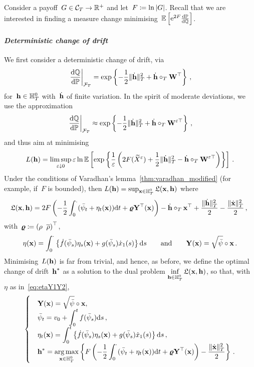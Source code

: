 Consider a payoff~$G\in\Cc_T\rightarrow\RR^{+}$ and let~$F\defEqual\nobreak\ln|G|$. 
Recall that we are interested in finding a measure change minimising~$\EE\left[\E^{2F}\frac{\D\PP}{\D\QQ}\right]$.\\

\paragraph{\textit{Deterministic change of drift}}
We first consider a deterministic change of drift, via 
\[
\left.\frac{\D\QQ}{\D\PP}\right\vert_{\Ff_T} = \exp\left\{-\frac{1}{2}\|\dot{\hh}\|_{T}^2 + \dot{\hh}\cT \Wf^\top\right\}\,,
\]
for~$\hh \in \HH_T^0$ with~$\dot{\hh}$ of finite variation. 
In the spirit of moderate deviations, we use the approximation 
\[
\left.\frac{\D\QQ}{\D\PP}\right\vert_{\Ff_T} \approx \exp\left\{-\frac{1}{2}\|\dot{\hh}\|_{T}^2 + \dot{\hh}\cT \Wf^{\eps\top}\right\}\,,
\]
and thus aim at minimising
\[
L(\hh) = \limsup\limits_{\eps \downarrow 0} \eps\ln\EE\left[\exp\left\{\frac{1}{\eps}\left(
2F(\widetilde{X}^\eps) + \frac{1}{2}\|\dot{\hh}\|_{T}^2 - \dot{\hh}\cT \Wf^{\eps\top}\right)\right\}\right]\,.
\]
Under the conditions of Varadhan's lemma~\ref{thm:varadhan_modified} 
(for example, if~$F$ is bounded), then
$L(\hh) =\nobreak \sup_{\xx \in \HH_T^0} \Lf(\xx,\hh)$ where
$$
\Lf(\xx,\hh)
 = 2 F\left(-\frac{1}{2}\int_0^.(\bar\psi_t + \eta_t(\xx))\D t + \vrho\Yf^\top(\xx) \right) - \dot{\hh}\cT\xx^\top + \frac{\|\dot{\hh}\|_{T}^2}{2} - \frac{\|\dot{\xx}\|_{T}^2}{2}\,,
~$$
with~$\vrho \defEqual \left(\rho \;\; \brho\right)^\top$,
\begin{equation}\label{eq:etaY1Y2}
\eta(\xx) = \int_0^\cdot\left\{\dot{f}(\bar\psi_s)\eta_s(\xx) + g(\bar\psi_s)\dot{x}_1(s)\right\}\D s
\qquad\text{and}\qquad
\Yf(\xx) = \sqrt{\bar\psi}\circ \xx\,.
\end{equation}
Minimising~$L(\hh)$ is far from trivial, 
and hence, as before, we define the optimal change of drift~$\hh^{*}$ as a solution to the dual problem
$\inf\limits_{\hh \in \HH_T^0}\Lf(\xx,\hh)$,
so that, with~$\eta$ as in~\eqref{eq:etaY1Y2},
\begin{equation}\label{eq:optidetdrift}
\begin{cases}
&\displaystyle \Yf(\xx) = \sqrt{\bar\psi}\circ \xx, \\
&\displaystyle \bar\psi_t = v_0 + \int_0^t f(\bar\psi_s)\D s\,, \\
&\displaystyle \eta_t(\xx) = \int_0^t\left\{\dot{f}(\bar\psi_s)\eta_s(\xx) + g(\bar\psi_s)\dot{x}_1(s)\right\}\D s\,, \\
&\displaystyle \hh^{*} = \argmax\limits_{\xx \in \HH_T^0} \left\{F\left(-\frac{1}{2}\int_0^\cdot(\bar\psi_t + \eta_t(\xx))\D t + \vrho\Yf^\top(\xx)\right)- \frac{\|\dot{\xx}\|_{T}^2}{2}\right\}\,.
\end{cases}
\end{equation}
